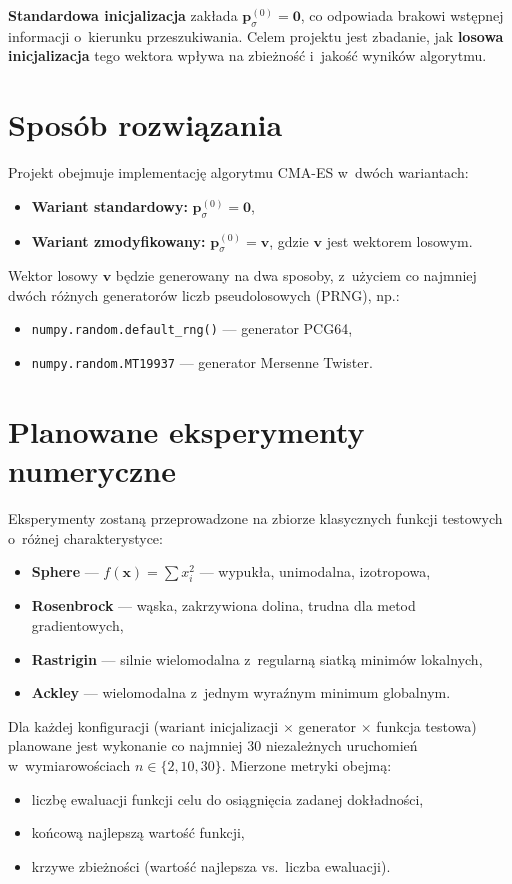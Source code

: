 \documentclass[12pt,a4paper]{article}
\begin{document}
\textbf{Standardowa inicjalizacja} zakłada $\mathbf{p}_\sigma^{(0)} = \mathbf{0}$, co odpowiada brakowi wstępnej informacji o~kierunku przeszukiwania. Celem projektu jest zbadanie, jak \textbf{losowa inicjalizacja} tego wektora wpływa na zbieżność i~jakość wyników algorytmu.
 
\section{Sposób rozwiązania}
 
Projekt obejmuje implementację algorytmu CMA-ES w~dwóch wariantach:
\begin{itemize}
    \item \textbf{Wariant standardowy:} $\mathbf{p}_\sigma^{(0)} = \mathbf{0}$,
    \item \textbf{Wariant zmodyfikowany:} $\mathbf{p}_\sigma^{(0)} = \mathbf{v}$, gdzie $\mathbf{v}$ jest wektorem losowym.
\end{itemize}
Wektor losowy $\mathbf{v}$ będzie generowany na dwa sposoby, z~użyciem co najmniej dwóch różnych generatorów liczb pseudolosowych (PRNG), np.:
\begin{itemize}
    \item \texttt{numpy.random.default\_rng()} --- generator PCG64,
    \item \texttt{numpy.random.MT19937} --- generator Mersenne Twister.
\end{itemize}

\section{Planowane eksperymenty numeryczne}
 
Eksperymenty zostaną przeprowadzone na zbiorze klasycznych funkcji testowych o~różnej charakterystyce:
\begin{itemize}
    \item \textbf{Sphere} --- $f(\mathbf{x}) = \sum x_i^2$ --- wypukła, unimodalna, izotropowa,
    \item \textbf{Rosenbrock} --- wąska, zakrzywiona dolina, trudna dla metod gradientowych,
    \item \textbf{Rastrigin} --- silnie wielomodalna z~regularną siatką minimów lokalnych,
    \item \textbf{Ackley} --- wielomodalna z~jednym wyraźnym minimum globalnym.
\end{itemize}
 
Dla każdej konfiguracji (wariant inicjalizacji $\times$ generator $\times$ funkcja testowa) planowane jest wykonanie co najmniej 30 niezależnych uruchomień w~wymiarowościach $n \in \{2, 10, 30\}$. Mierzone metryki obejmą:
\begin{itemize}
    \item liczbę ewaluacji funkcji celu do osiągnięcia zadanej dokładności,
    \item końcową najlepszą wartość funkcji,
    \item krzywe zbieżności (wartość najlepsza vs.\ liczba ewaluacji).
\end{itemize}
 
\end{document}
